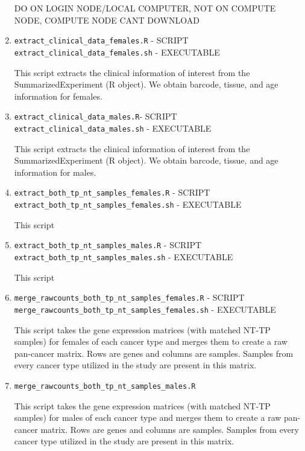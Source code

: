 \documentclass[10pt]{article}
\begin{document}
\begin{enumerate}
DO ON LOGIN NODE/LOCAL COMPUTER, NOT ON COMPUTE NODE, COMPUTE NODE CANT DOWNLOAD
\item\texttt{extract\_clinical\_data\_females.R} - SCRIPT\newline
\texttt{extract\_clinical\_data\_females.sh} - EXECUTABLE

This script extracts the clinical information of interest from the SummarizedExperiment (R object). We obtain barcode, tissue, and age information for females.

\item\texttt{extract\_clinical\_data\_males.R}- SCRIPT\newline
\texttt{extract\_clinical\_data\_males.sh} - EXECUTABLE

This script extracts the clinical information of interest from the SummarizedExperiment (R object). We obtain barcode, tissue, and age information for males.

\item\texttt{extract\_both\_tp\_nt\_samples\_females.R} - SCRIPT \newline
\texttt{extract\_both\_tp\_nt\_samples\_females.sh} - EXECUTABLE

This script 

\item\texttt{extract\_both\_tp\_nt\_samples\_males.R} - SCRIPT \newline
\texttt{extract\_both\_tp\_nt\_samples\_males.sh} - EXECUTABLE

This script 

\item\texttt{merge\_rawcounts\_both\_tp\_nt\_samples\_females.R} - SCRIPT \newline
\texttt{merge\_rawcounts\_both\_tp\_nt\_samples\_females.sh} - EXECUTABLE

This script takes the gene expression matrices (with matched NT-TP samples) for females of each cancer type and merges them to create a raw pan-cancer matrix. Rows are genes and columns are samples. Samples from every cancer type utilized in the study are present in this matrix.

\item\texttt{merge\_rawcounts\_both\_tp\_nt\_samples\_males.R}

This script takes the gene expression matrices (with matched NT-TP samples) for males of each cancer type and merges them to create a raw pan-cancer matrix. Rows are genes and columns are samples. Samples from every cancer type utilized in the study are present in this matrix.

\end{enumerate}
\end{document}

